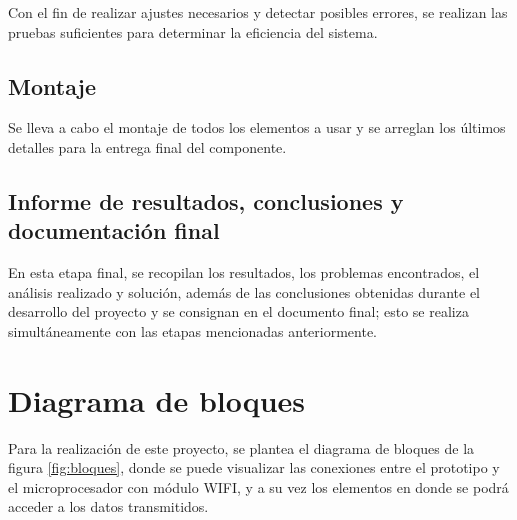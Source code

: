 Con el fin de realizar ajustes necesarios y detectar posibles errores, se realizan las pruebas suficientes para determinar la eficiencia del sistema.

\subsection{Montaje}

Se lleva a cabo el montaje de todos los elementos a usar y se arreglan los últimos detalles para la entrega final del componente. 

\subsection{Informe de resultados, conclusiones y documentación final }

En esta etapa final, se recopilan los resultados, los problemas encontrados, el análisis realizado y solución, además de las conclusiones obtenidas durante el desarrollo del proyecto y se consignan en el documento final; esto se realiza simultáneamente con las etapas mencionadas anteriormente.

\section{Diagrama de bloques}

Para la realización de este proyecto, se plantea el diagrama de bloques de la figura \ref{fig:bloques}, donde se puede visualizar las conexiones entre el prototipo y el microprocesador con módulo WIFI, y a su vez los elementos en donde se podrá acceder a los datos transmitidos.


